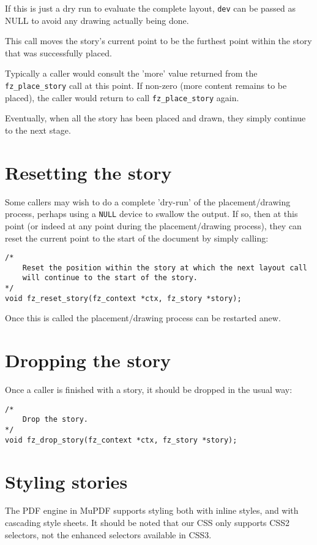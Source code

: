 \documentclass[oneside]{book}
\begin{document}
If this is just a dry run to evaluate the complete layout, \texttt{dev} can be passed as NULL to avoid any drawing actually being done.

This call moves the story's current point to be the furthest point within the story that was successfully placed.

Typically a caller would consult the 'more' value returned from the \texttt{fz\_place\_story} call at this point. If non-zero (more content remains to be placed), the caller would return to call \texttt{fz\_place\_story} again.

Eventually, when all the story has been placed and drawn, they simply continue to the next stage.

\section{Resetting the story}

Some callers may wish to do a complete 'dry-run' of the placement/drawing process, perhaps using a \texttt{NULL} device to swallow the output. If so, then at this point (or indeed at any point during the placement/drawing process), they can reset the current point to the start of the document by simply calling:

\begin{lstlisting}
/*
	Reset the position within the story at which the next layout call
	will continue to the start of the story.
*/
void fz_reset_story(fz_context *ctx, fz_story *story);
\end{lstlisting}

Once this is called the placement/drawing process can be restarted anew.

\section{Dropping the story}

Once a caller is finished with a story, it should be dropped in the usual way:

\begin{lstlisting}
/*
	Drop the story.
*/
void fz_drop_story(fz_context *ctx, fz_story *story);
\end{lstlisting}


\section{Styling stories}
\label{StoryCSS}

The PDF engine in MuPDF supports styling both with inline styles, and with cascading style sheets. It should be noted that our CSS only supports CSS2 selectors, not the enhanced selectors available in CSS3.
\end{document}
